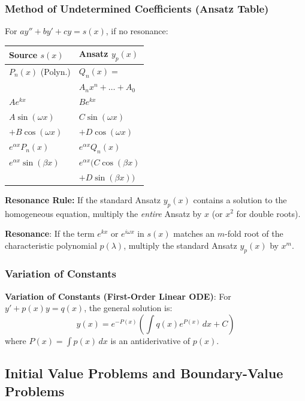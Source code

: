 \subsubsection{Method of Undetermined Coefficients (Ansatz Table)}
For $ay'' + by' + cy = s(x)$, if no resonance:
\begin{center}
\scriptsize
\setlength{\tabcolsep}{2pt}
\begin{tabular}{|l|l|}
\hline
\textbf{Source $s(x)$} & \textbf{Ansatz $y_p(x)$} \\ \hline
$P_n(x)$ (Polyn.) & $Q_n(x) = $ \\
& $A_n x^n + \dots + A_0$ \\ \hline
$A e^{kx}$ & $B e^{kx}$ \\ \hline
$A \sin(\omega x)$ & $C \sin(\omega x)$ \\
$+ B \cos(\omega x)$ & $+ D \cos(\omega x)$ \\ \hline
$e^{\alpha x} P_n(x)$ & $e^{\alpha x} Q_n(x)$ \\ \hline
$e^{\alpha x} \sin(\beta x)$ & $e^{\alpha x} (C \cos(\beta x)$ \\
& $+ D \sin(\beta x))$ \\ \hline
\end{tabular}
\end{center}
\textbf{Resonance Rule:} If the standard Ansatz $y_p(x)$ contains a solution to the homogeneous equation, multiply the \textit{entire} Ansatz by $x$ (or $x^2$ for double roots).

\begin{important}
    \textbf{Resonance}: If the term $e^{kx}$ or $e^{i\omega x}$ in $s(x)$ matches an $m$-fold root of the characteristic polynomial $p(\lambda)$, multiply the standard Ansatz $y_p(x)$ by $x^m$.
\end{important}

\subsubsection{Variation of Constants}

\begin{theorem}
    \textbf{Variation of Constants (First-Order Linear ODE)}: For $y' + p(x)y = q(x)$, the general solution is:
    $$y(x) = e^{-P(x)} \left( \int q(x) e^{P(x)} \, dx + C \right)$$
    where $P(x) = \int p(x) \, dx$ is an antiderivative of $p(x)$.
\end{theorem}

\subsection{Initial Value Problems and Boundary-Value Problems}

